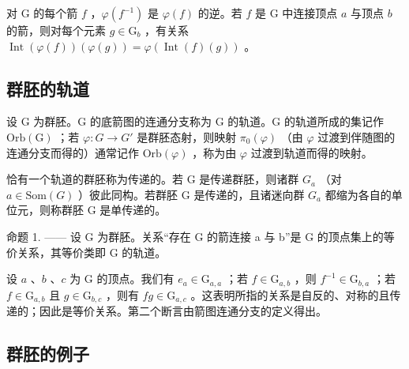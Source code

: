 对 G 的每个箭 \(f\) ，\(\varphi(f^{-1})\) 是 \(\varphi(f)\) 的逆。若 \(f\) 是 G 中连接顶点 \(a\) 与顶点 \(b\) 的箭，则对每个元素 \(g \in \mathrm{G}_b\) ，有关系 \(\operatorname{Int}(\varphi(f))(\varphi(g)) = \varphi(\operatorname{Int}(f)(g))\) 。

\subsection{群胚的轨道}

设 G 为群胚。G 的底箭图的连通分支称为 G 的轨道。G 的轨道所成的集记作 \(\mathrm{Orb}(\mathrm{G})\) ；若 \(\varphi: G \to G'\) 是群胚态射，则映射 \(\pi_{0}(\varphi)\) （由 \(\varphi\) 过渡到伴随图的连通分支而得的）通常记作 \(\mathrm{Orb}(\varphi)\) ，称为由 \(\varphi\) 过渡到轨道而得的映射。

恰有一个轨道的群胚称为传递的。若 G 是传递群胚，则诸群 \(G_{a}\) （对 \(a \in \text{Som}(G)\) ）彼此同构。若群胚 G 是传递的，且诸迷向群 \(G_{a}\) 都缩为各自的单位元，则称群胚 G 是单传递的。

命题 1. —— 设 G 为群胚。关系“存在 G 的箭连接 a 与 b”是 G 的顶点集上的等价关系，其等价类即 G 的轨道。

设 \(a\) 、\(b\) 、\(c\) 为 G 的顶点。我们有 \(e_a \in \mathrm{G}_{a,a}\) ；若 \(f \in \mathrm{G}_{a,b}\) ，则 \(f^{-1} \in \mathrm{G}_{b,a}\) ；若 \(f \in \mathrm{G}_{a,b}\) 且 \(g \in \mathrm{G}_{b,c}\) ，则有 \(fg \in \mathrm{G}_{a,c}\) 。这表明所指的关系是自反的、对称的且传递的；因此是等价关系。第二个断言由箭图连通分支的定义得出。

\subsection{群胚的例子}

